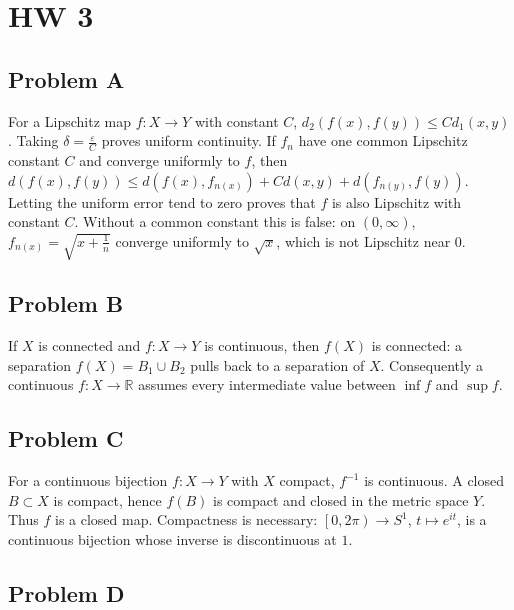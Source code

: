 \chapter{HW 3}

\section{Problem A}

For a Lipschitz map \(f:X\rightarrow Y\) with constant \(C\), \(d_{2}\left( {f(x),f(y)} \right) \leq Cd_{1}\left( {x,y} \right)\). Taking \(\delta = \frac{\varepsilon}{C}\) proves uniform continuity. If \(f_{n}\) have one common Lipschitz constant \(C\) and converge uniformly to \(f\), then \(d\left( {f(x),f(y)} \right) \leq d\left( {f(x),f_{n{(x)}}} \right) + Cd\left( {x,y} \right) + d\left( {f_{n{(y)}},f(y)} \right)\). Letting the uniform error tend to zero proves that \(f\) is also Lipschitz with constant \(C\). Without a common constant this is false: on \(\left( {0,\infty} \right)\), \(f_{n{(x)}} = \sqrt{x + \frac{1}{n}}\) converge uniformly to \(\sqrt{x}\), which is not Lipschitz near \(0\).

\section{Problem B}

If \(X\) is connected and \(f:X\rightarrow Y\) is continuous, then \(f(X)\) is connected: a separation \(f(X) = B_{1} \cup B_{2}\) pulls back to a separation of \(X\). Consequently a continuous \(f:X\rightarrow\mathbb{R}\) assumes every intermediate value between \(\inf f\) and \(\sup f\).

\section{Problem C}

For a continuous bijection \(f:X\rightarrow Y\) with \(X\) compact, \(f^{- 1}\) is continuous. A closed \(B \subset X\) is compact, hence \(f(B)\) is compact and closed in the metric space \(Y\). Thus \(f\) is a closed map. Compactness is necessary: \(\left\lbrack {0,2\pi} \right)\rightarrow S^{1}\), \(t\mapsto e^{it}\), is a continuous bijection whose inverse is discontinuous at \(1\).

\section{Problem D}

